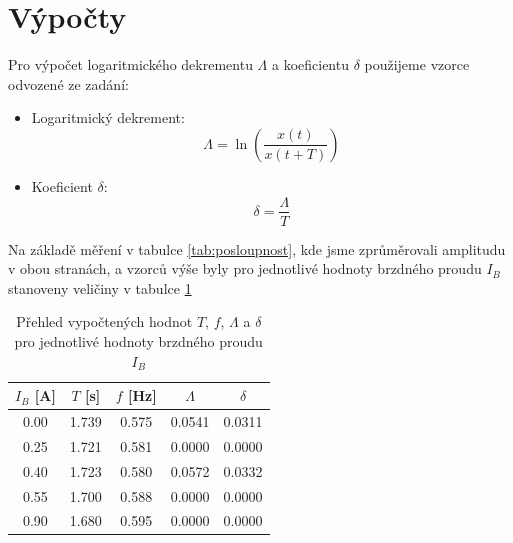 \documentclass[a4paper,12pt]{article}
\begin{document}
\section{Výpočty}

Pro výpočet logaritmického dekrementu $\Lambda$ a koeficientu $\delta$ použijeme vzorce odvozené ze zadání:

\begin{itemize}
    \item Logaritmický dekrement: $$ \Lambda = \ln\left( \frac{x(t)}{x(t+T)} \right) $$
    \item Koeficient \(\delta\): $$ \delta = \frac{\Lambda}{T} $$
\end{itemize}

Na základě měření v tabulce \ref{tab:posloupnost}, kde jsme zprůměrovali amplitudu v obou stranách, a vzorců výše byly pro jednotlivé hodnoty brzdného proudu $I_B$ stanoveny veličiny v tabulce \ref{tab:shrnutihodnoty}

\begin{table}[H]
    \centering
    \renewcommand{\arraystretch}{1.5}
    \begin{tabular}{|c|c|c|c|c|}
        \hline
        \textbf{$I_B$ [A]} & \textbf{$T$ [s]} & \textbf{$f$ [Hz]} & \textbf{$\Lambda$} & \textbf{$\delta$} \\ \hline
        0.00 & 1.739 & 0.575 & 0.0541 & 0.0311 \\ \hline
        0.25 & 1.721 & 0.581 & 0.0000 & 0.0000 \\ \hline
        0.40 & 1.723 & 0.580 & 0.0572 & 0.0332 \\ \hline
        0.55 & 1.700 & 0.588 & 0.0000 & 0.0000 \\ \hline
        0.90 & 1.680 & 0.595 & 0.0000 & 0.0000 \\ \hline
    \end{tabular}
    \caption{Přehled vypočtených hodnot $T$, $f$, $\Lambda$ a $\delta$ pro jednotlivé hodnoty brzdného proudu $I_B$}
    \label{tab:shrnutihodnoty}
\end{table}
\end{document}
